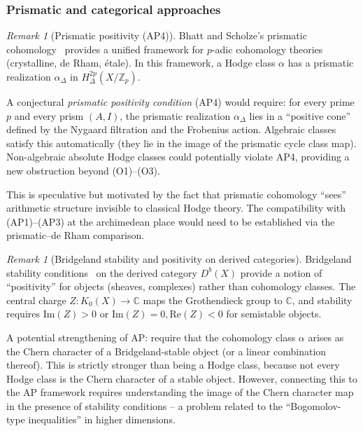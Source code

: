 \documentclass[aps,prd,twocolumn,superscriptaddress,nofootinbib]{revtex4-2}
\theoremstyle{definition}
\theoremstyle{remark}
\newtheorem{remark}[theorem]{Remark}
\begin{document}
\subsubsection{Prismatic and categorical approaches}

\begin{remark}[Prismatic positivity (AP4)]
\label{rem:prismatic}
Bhatt and Scholze's prismatic cohomology~\cite{BhattScholze2022} provides a unified framework for $p$-adic cohomology theories (crystalline, de Rham, \'etale). In this framework, a Hodge class $\alpha$ has a prismatic realization $\alpha_{\Delta}$ in $H^{2p}_{\Delta}(X/\mathbb{Z}_p)$.

A conjectural \textit{prismatic positivity condition} (AP4) would require: for every prime $p$ and every prism $(A, I)$, the prismatic realization $\alpha_{\Delta}$ lies in a ``positive cone'' defined by the Nygaard filtration and the Frobenius action. Algebraic classes satisfy this automatically (they lie in the image of the prismatic cycle class map). Non-algebraic absolute Hodge classes could potentially violate AP4, providing a new obstruction beyond (O1)--(O3).

This is speculative but motivated by the fact that prismatic cohomology ``sees'' arithmetic structure invisible to classical Hodge theory. The compatibility with (AP1)--(AP3) at the archimedean place would need to be established via the prismatic--de Rham comparison.
\end{remark}

\begin{remark}[Bridgeland stability and positivity on derived categories]
\label{rem:bridgeland}
Bridgeland stability conditions~\cite{Bridgeland2007} on the derived category $D^b(X)$ provide a notion of ``positivity'' for objects (sheaves, complexes) rather than cohomology classes. The central charge $Z: K_0(X) \to \mathbb{C}$ maps the Grothendieck group to $\mathbb{C}$, and stability requires $\mathrm{Im}(Z) > 0$ or $\mathrm{Im}(Z) = 0, \mathrm{Re}(Z) < 0$ for semistable objects.

A potential strengthening of AP: require that the cohomology class $\alpha$ arises as the Chern character of a Bridgeland-stable object (or a linear combination thereof). This is strictly stronger than being a Hodge class, because not every Hodge class is the Chern character of a stable object. However, connecting this to the AP framework requires understanding the image of the Chern character map in the presence of stability conditions -- a problem related to the ``Bogomolov-type inequalities'' in higher dimensions.
\end{remark}
\end{document}
